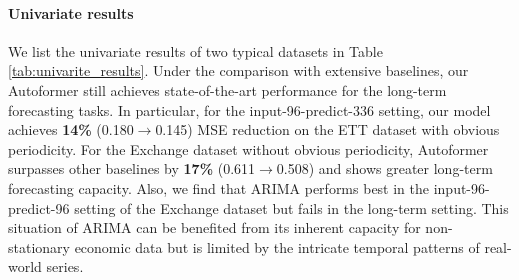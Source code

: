 \paragraph{Univariate results} We list the univariate results of two typical datasets in Table \ref{tab:univarite_results}. Under the comparison with extensive baselines, our Autoformer still achieves state-of-the-art performance for the long-term forecasting tasks. In particular, for the input-96-predict-336 setting, our model achieves \textbf{14\%} (0.180$\to$0.145) MSE reduction on the ETT dataset with obvious periodicity. 
For the Exchange dataset without obvious periodicity, Autoformer surpasses other baselines by \textbf{17\%} (0.611$\to$0.508) and shows greater long-term forecasting capacity. Also, we find that ARIMA \cite{Anderson1976TimeSeries2E} performs best in the input-96-predict-96 setting of the Exchange dataset but fails in the long-term setting. This situation of ARIMA can be benefited from its inherent capacity for non-stationary economic data but is limited by the intricate temporal patterns of real-world series.
